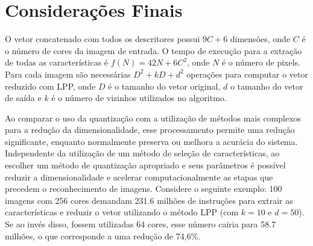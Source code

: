 \section{Considerações Finais}

O vetor concatenado com todos os descritores possui $9C + 6$ dimensões, onde $C$ é o número de cores da imagem de entrada. O tempo de execução para a extração de todas as características é $f(N) = 42N + 6C^2$, onde $N$ é o número de pixels. Para cada imagem são necessárias $D^2 + kD + d^2$ operações para computar o vetor reduzido com LPP, onde $D$ é o tamanho do vetor original, $d$ o tamanho do vetor de saída e $k$ é o número de vizinhos utilizados no algoritmo.

Ao comparar o uso da quantização com a utilização de métodos mais complexos para a redução da dimensionalidade, esse processamento permite uma redução significante, enquanto normalmente preserva ou melhora a acurácia do sistema. Independente da utilização de um método de seleção de características, ao escolher um método de quantização apropriado e seus parâmetros é possível reduzir a dimensionalidade e acelerar computacionalmente as etapas que precedem o reconhecimento de imagens. Considere o seguinte exemplo: 100 imagens com 256 cores demandam 231.6 milhões de instruções para extrair as características e reduzir o vetor utilizando o método LPP (com $k = 10$ e $d = 50$). Se ao invés disso, fossem utilizadas 64 cores, esse número cairia para 58.7 milhões, o que corresponde a uma redução de 74,6\%.

